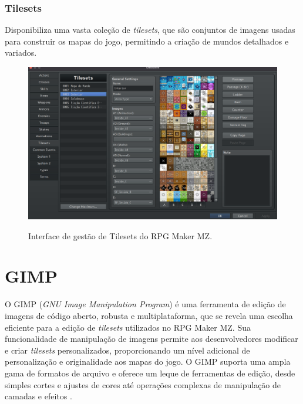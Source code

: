 \subsubsection*{Tilesets}
Disponibiliza uma vasta coleção de \textit{tilesets}, que são conjuntos de imagens usadas para construir os mapas do jogo, permitindo a criação de mundos detalhados e variados.

\begin{figure}[ht]
	\centering
	\caption{Interface de gestão de Tilesets do RPG Maker MZ.}
	\includegraphics[scale=0.3]{Textuais/Pictures/Tileset.png}
	\label{fig:rpgmaker-interface-tilesets}
\end{figure}


\section{GIMP}

O GIMP (\textit{GNU Image Manipulation Program}) é uma ferramenta de edição de imagens de código aberto, robusta e multiplataforma, que se revela uma escolha eficiente para a edição de \textit{tilesets} utilizados no RPG Maker MZ. Sua funcionalidade de manipulação de imagens permite aos desenvolvedores modificar e criar \textit{tilesets} personalizados, proporcionando um nível adicional de personalização e originalidade aos mapas do jogo. O GIMP suporta uma ampla gama de formatos de arquivo e oferece um leque de ferramentas de edição, desde simples cortes e ajustes de cores até operações complexas de manipulação de camadas e efeitos \cite{GIMP_Documentation}.

